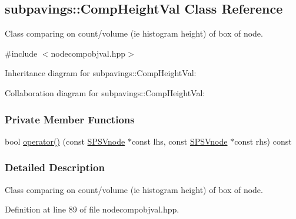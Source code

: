 \hypertarget{classsubpavings_1_1CompHeightVal}{\subsection{subpavings\-:\-:\-Comp\-Height\-Val \-Class \-Reference}
\label{classsubpavings_1_1CompHeightVal}
}


\-Class comparing on count/volume (ie histogram height) of box of node.  




{\ttfamily \#include $<$nodecompobjval.\-hpp$>$}



\-Inheritance diagram for subpavings\-:\-:\-Comp\-Height\-Val\-:


\-Collaboration diagram for subpavings\-:\-:\-Comp\-Height\-Val\-:
\subsubsection*{\-Private \-Member \-Functions}
\begin{DoxyCompactItemize}
\item 
bool \hyperlink{classsubpavings_1_1CompHeightVal_a867d36d4805a3bf2aebafbb3d19cedec}{operator()} (const \hyperlink{classsubpavings_1_1SPSVnode}{\-S\-P\-S\-Vnode} $\ast$const lhs, const \hyperlink{classsubpavings_1_1SPSVnode}{\-S\-P\-S\-Vnode} $\ast$const rhs) const 
\end{DoxyCompactItemize}


\subsubsection{\-Detailed \-Description}
\-Class comparing on count/volume (ie histogram height) of box of node. 

\-Definition at line 89 of file nodecompobjval.\-hpp.



